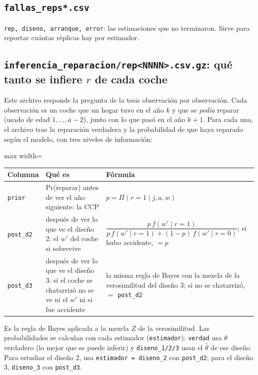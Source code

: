 \documentclass[11pt]{article}
\newcommand{\col}[1]{\texttt{#1}}
\newcommand{\archivo}[1]{\textbf{\texttt{#1}}}
\begin{document}
\subsection{\archivo{fallas\_reps*.csv}}
\col{rep, diseno, arranque, error}: las estimaciones que no terminaron. Sirve para reportar
cuántas réplicas hay por estimador.

\subsection{\archivo{inferencia\_reparacion/rep<NNNN>.csv.gz}: qué tanto se infiere $r$ de cada coche}

Este archivo responde la pregunta de la tesis observación por observación. Cada observación
es un coche que un hogar tuvo en el año $k$ y que se \emph{podía} reparar (usado de edad
$1,\dots,\bar a-2$), junto con lo que pasó en el año $k+1$. Para cada una, el archivo trae la
reparación verdadera y la probabilidad de que haya reparado según el modelo, con tres
niveles de información:

\begin{center}\small
\begin{adjustbox}{max width=\textwidth}\begin{tabular}{lp{6.2cm}p{6.2cm}}
\toprule
Columna & Qué es & Fórmula\\
\midrule
\col{prior} & Pr(reparar) antes de ver el año siguiente: la CCP & $p=\Pi(r=1\mid j,a,w)$\\
\col{post\_d2} & después de ver lo que ve el diseño 2: el $w'$ del coche si sobrevive & $\dfrac{p\,f(w'\mid r=1)}{p\,f(w'\mid r=1)+(1-p)\,f(w'\mid r=0)}$; si hubo accidente, $=p$\\
\col{post\_d3} & después de ver lo que ve el diseño 3: si el coche se chatarrizó no se ve ni el $w'$ ni si fue accidente & la misma regla de Bayes con la mezcla de la verosimilitud del diseño 3; si no se chatarrizó, $=$ \col{post\_d2}\\
\bottomrule
\end{tabular}\end{adjustbox}
\end{center}

Es la regla de Bayes aplicada a la mezcla $Z$ de la verosimilitud. Las probabilidades se
calculan con cada estimador (\col{estimador}): \col{verdad} usa $\theta$ verdadero (lo mejor
que se puede inferir) y \col{diseno\_1/2/3} usan el $\hat\theta$ de ese diseño.
Para estudiar el diseño 2, usa \col{estimador = diseno\_2} con \col{post\_d2}; para el
diseño 3, \col{diseno\_3} con \col{post\_d3}.
\end{document}
